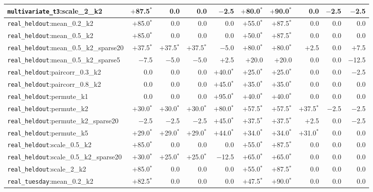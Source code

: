 \begin{table}[!tp]
\begin{tabular*}{\textwidth}{@{\extracolsep{\fill}}lrrrrrrrrr}
\texttt{multivariate\_t3}:scale\_2\_k2 & $+$87.5$^{*}$ & 0.0 & 0.0 & $-$2.5 & $+$80.0$^{*}$ & $+$90.0$^{*}$ & 0.0 & $-$2.5 & $-$2.5 \\
\midrule
\texttt{real\_heldout}:mean\_0.2\_k2 & $+$85.0$^{*}$ & 0.0 & 0.0 & 0.0 & $+$55.0$^{*}$ & $+$87.5$^{*}$ & 0.0 & 0.0 & 0.0 \\
\texttt{real\_heldout}:mean\_0.5\_k2 & $+$85.0$^{*}$ & 0.0 & 0.0 & 0.0 & $+$50.0$^{*}$ & $+$87.5$^{*}$ & 0.0 & 0.0 & 0.0 \\
\texttt{real\_heldout}:mean\_0.5\_k2\_sparse20 & $+$37.5$^{*}$ & $+$37.5$^{*}$ & $+$37.5$^{*}$ & $-$5.0 & $+$80.0$^{*}$ & $+$80.0$^{*}$ & $+$2.5 & 0.0 & $+$7.5 \\
\texttt{real\_heldout}:mean\_0.5\_k2\_sparse5 & $-$7.5 & $-$5.0 & $-$5.0 & $+$2.5 & $+$20.0 & $+$20.0 & 0.0 & 0.0 & $-$12.5 \\
\texttt{real\_heldout}:paircorr\_0.3\_k2 & 0.0 & 0.0 & 0.0 & $+$40.0$^{*}$ & $+$25.0$^{*}$ & $+$25.0$^{*}$ & 0.0 & 0.0 & $-$2.5 \\
\texttt{real\_heldout}:paircorr\_0.8\_k2 & 0.0 & 0.0 & 0.0 & $+$45.0$^{*}$ & $+$35.0$^{*}$ & $+$35.0$^{*}$ & 0.0 & 0.0 & 0.0 \\
\texttt{real\_heldout}:permute\_k1 & 0.0 & 0.0 & 0.0 & $+$95.0$^{*}$ & $+$40.0$^{*}$ & $+$40.0$^{*}$ & 0.0 & 0.0 & 0.0 \\
\texttt{real\_heldout}:permute\_k2 & $+$30.0$^{*}$ & $+$30.0$^{*}$ & $+$30.0$^{*}$ & $+$80.0$^{*}$ & $+$57.5$^{*}$ & $+$57.5$^{*}$ & $+$37.5$^{*}$ & $-$2.5 & $-$2.5 \\
\texttt{real\_heldout}:permute\_k2\_sparse20 & $-$2.5 & $-$2.5 & $-$2.5 & $+$45.0$^{*}$ & $+$37.5$^{*}$ & $+$37.5$^{*}$ & $+$2.5 & 0.0 & $-$2.5 \\
\texttt{real\_heldout}:permute\_k5 & $+$29.0$^{*}$ & $+$29.0$^{*}$ & $+$29.0$^{*}$ & $+$44.0$^{*}$ & $+$34.0$^{*}$ & $+$34.0$^{*}$ & $+$31.0$^{*}$ & 0.0 & 0.0 \\
\texttt{real\_heldout}:scale\_0.5\_k2 & $+$85.0$^{*}$ & 0.0 & 0.0 & 0.0 & $+$55.0$^{*}$ & $+$87.5$^{*}$ & 0.0 & 0.0 & 0.0 \\
\texttt{real\_heldout}:scale\_0.5\_k2\_sparse20 & $+$30.0$^{*}$ & $+$25.0$^{*}$ & $+$25.0$^{*}$ & $-$12.5 & $+$65.0$^{*}$ & $+$65.0$^{*}$ & 0.0 & 0.0 & 0.0 \\
\texttt{real\_heldout}:scale\_2\_k2 & $+$85.0$^{*}$ & 0.0 & 0.0 & 0.0 & $+$55.0$^{*}$ & $+$87.5$^{*}$ & 0.0 & 0.0 & 0.0 \\
\midrule
\texttt{real\_tuesday}:mean\_0.2\_k2 & $+$82.5$^{*}$ & 0.0 & 0.0 & 0.0 & $+$47.5$^{*}$ & $+$90.0$^{*}$ & 0.0 & 0.0 & 0.0 \\

\end{tabular*}
\end{table}
